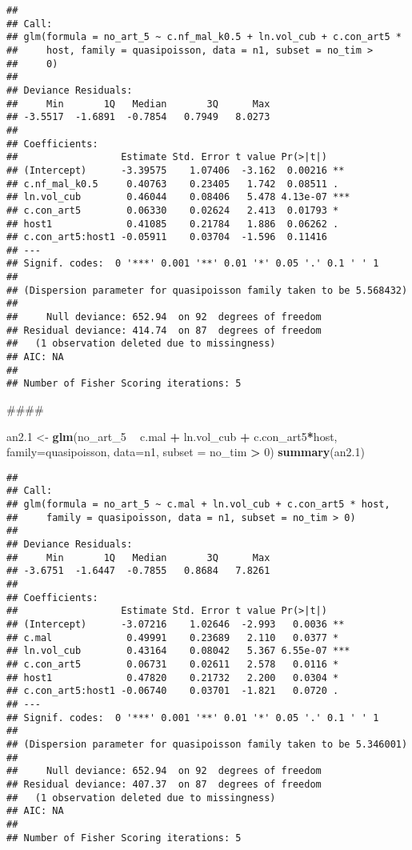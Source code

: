 \documentclass[]{article}
\newenvironment{Shaded}{\begin{snugshade}}{\end{snugshade}}
\newcommand{\KeywordTok}[1]{\textcolor[rgb]{0.13,0.29,0.53}{\textbf{#1}}}
\newcommand{\DataTypeTok}[1]{\textcolor[rgb]{0.13,0.29,0.53}{#1}}
\newcommand{\DecValTok}[1]{\textcolor[rgb]{0.00,0.00,0.81}{#1}}
\newcommand{\StringTok}[1]{\textcolor[rgb]{0.31,0.60,0.02}{#1}}
\newcommand{\OperatorTok}[1]{\textcolor[rgb]{0.81,0.36,0.00}{\textbf{#1}}}
\newcommand{\NormalTok}[1]{#1}
\begin{document}
\begin{verbatim}
## 
## Call:
## glm(formula = no_art_5 ~ c.nf_mal_k0.5 + ln.vol_cub + c.con_art5 * 
##     host, family = quasipoisson, data = n1, subset = no_tim > 
##     0)
## 
## Deviance Residuals: 
##     Min       1Q   Median       3Q      Max  
## -3.5517  -1.6891  -0.7854   0.7949   8.0273  
## 
## Coefficients:
##                  Estimate Std. Error t value Pr(>|t|)    
## (Intercept)      -3.39575    1.07406  -3.162  0.00216 ** 
## c.nf_mal_k0.5     0.40763    0.23405   1.742  0.08511 .  
## ln.vol_cub        0.46044    0.08406   5.478 4.13e-07 ***
## c.con_art5        0.06330    0.02624   2.413  0.01793 *  
## host1             0.41085    0.21784   1.886  0.06262 .  
## c.con_art5:host1 -0.05911    0.03704  -1.596  0.11416    
## ---
## Signif. codes:  0 '***' 0.001 '**' 0.01 '*' 0.05 '.' 0.1 ' ' 1
## 
## (Dispersion parameter for quasipoisson family taken to be 5.568432)
## 
##     Null deviance: 652.94  on 92  degrees of freedom
## Residual deviance: 414.74  on 87  degrees of freedom
##   (1 observation deleted due to missingness)
## AIC: NA
## 
## Number of Fisher Scoring iterations: 5
\end{verbatim}

\begin{Shaded}
\begin{Highlighting}[]
\NormalTok{####}


\NormalTok{an2.}\DecValTok{1}\NormalTok{ <-}\StringTok{ }\KeywordTok{glm}\NormalTok{(no_art_}\DecValTok{5} \OperatorTok{~}\StringTok{ }\NormalTok{c.mal }\OperatorTok{+}\StringTok{ }\NormalTok{ln.vol_cub }\OperatorTok{+}\StringTok{ }\NormalTok{c.con_art5}\OperatorTok{*}\NormalTok{host,}
           \DataTypeTok{family=}\NormalTok{quasipoisson, }\DataTypeTok{data=}\NormalTok{n1, }\DataTypeTok{subset =}\NormalTok{ no_tim }\OperatorTok{>}\StringTok{ }\DecValTok{0}\NormalTok{)}
\KeywordTok{summary}\NormalTok{(an2.}\DecValTok{1}\NormalTok{)}
\end{Highlighting}
\end{Shaded}

\begin{verbatim}
## 
## Call:
## glm(formula = no_art_5 ~ c.mal + ln.vol_cub + c.con_art5 * host, 
##     family = quasipoisson, data = n1, subset = no_tim > 0)
## 
## Deviance Residuals: 
##     Min       1Q   Median       3Q      Max  
## -3.6751  -1.6447  -0.7855   0.8684   7.8261  
## 
## Coefficients:
##                  Estimate Std. Error t value Pr(>|t|)    
## (Intercept)      -3.07216    1.02646  -2.993   0.0036 ** 
## c.mal             0.49991    0.23689   2.110   0.0377 *  
## ln.vol_cub        0.43164    0.08042   5.367 6.55e-07 ***
## c.con_art5        0.06731    0.02611   2.578   0.0116 *  
## host1             0.47820    0.21732   2.200   0.0304 *  
## c.con_art5:host1 -0.06740    0.03701  -1.821   0.0720 .  
## ---
## Signif. codes:  0 '***' 0.001 '**' 0.01 '*' 0.05 '.' 0.1 ' ' 1
## 
## (Dispersion parameter for quasipoisson family taken to be 5.346001)
## 
##     Null deviance: 652.94  on 92  degrees of freedom
## Residual deviance: 407.37  on 87  degrees of freedom
##   (1 observation deleted due to missingness)
## AIC: NA
## 
## Number of Fisher Scoring iterations: 5
\end{verbatim}
\end{document}
